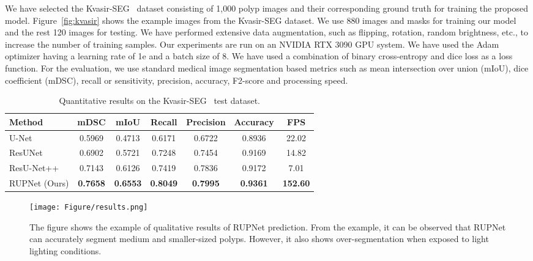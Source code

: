 \documentclass{article}
\begin{document}
We have selected the Kvasir-SEG~\cite{jha2020kvasir} dataset consisting of 1,000 polyp images and their corresponding ground truth for training the proposed model. Figure~\ref{fig:kvasir} shows the example images from the Kvasir-SEG dataset. We use 880 images and masks for training our model and the rest 120 images for testing. We have performed extensive data augmentation, such as flipping, rotation, random brightness, etc., to increase the number of training samples. Our experiments are run on an NVIDIA RTX 3090 GPU system. We have used the Adam optimizer having a learning rate of 1e  and a batch size of 8. We have used a combination of binary cross-entropy and dice loss as a loss function. For the evaluation, we use standard medical image segmentation based metrics such as mean intersection over union (mIoU), dice coefficient (mDSC), recall or sensitivity, precision, accuracy, F2-score and processing speed. 
\begin{table*}[t!]
   \def\arraystretch{1.6}
    \setlength\tabcolsep{6pt}
    \par\bigskip
\centering
\caption{Quantitative results on the Kvasir-SEG~\cite{jha2020kvasir} test dataset.}
 \begin{tabular} {l|c|c|c|c|c|c}
\toprule
\textbf{Method} & \textbf{mDSC}  &\textbf{mIoU}  &\textbf{Recall}& \textbf{Precision} &\textbf{Accuracy} &\textbf{FPS}\\ 
\hline

U-Net~\cite{ronneberger2015u}  &0.5969  & 0.4713 &0.6171 & 0.6722 &0.8936 & 22.02 \\

ResUNet~\cite{zhang2018road}&0.6902 &0.5721 &0.7248 &0.7454 &0.9169 &14.82\\

ResU-Net++~\cite{jha2019resunet++}&0.7143 &0.6126 &0.7419 &0.7836 &0.9172 &7.01\\

RUPNet (Ours) &\textbf{0.7658} &\textbf{0.6553} &\textbf{0.8049} &\textbf{0.7995} &\textbf{0.9361} &\textbf{152.60}\\

\bottomrule
\end{tabular}
\label{tab:results}
\end{table*}


\begin{figure}[!t]
\centering
\texttt{[image: Figure/results.png]} 
\caption{The figure shows the example of qualitative results of RUPNet prediction. From the example, it can be observed that RUPNet can accurately segment medium and smaller-sized polyps. However, it also shows over-segmentation when exposed to light lighting conditions.}
\label{fig:qualitative}
\end{figure}
\end{document}
